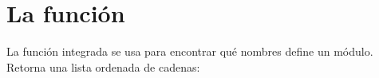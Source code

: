 \documentclass[a5paper,10pt,spanish]{sphinxmanual}
\begin{document}
\begin{sphinxVerbatim}[commandchars=\\\{\}]
 
\end{sphinxVerbatim}


\section{La función }
\label{\detokenize{tutorial/modules:the-dir-function}}\label{\detokenize{tutorial/modules:tut-dir}}
\sphinxAtStartPar
La función integrada  se usa para encontrar qué nombres define un módulo.  Retorna una lista ordenada de cadenas:
\end{document}
